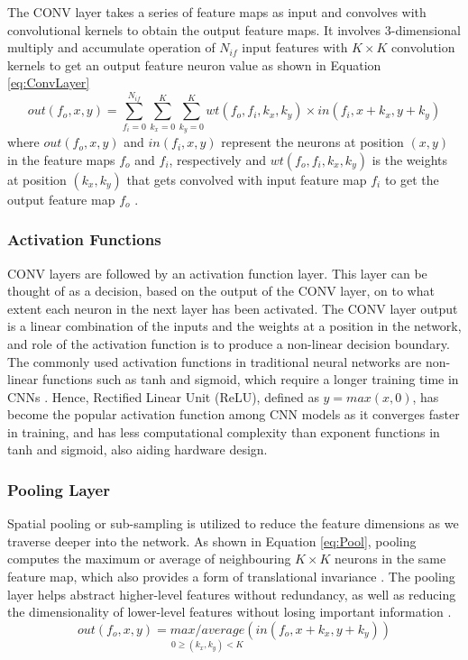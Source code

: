 \documentclass[12pt]{article}
\begin{document}
The CONV layer takes a series of feature maps as input and convolves with convolutional kernels to obtain the output feature maps. It involves 3-dimensional multiply and accumulate operation of $N_{if}$ input features with $K\times K$ convolution kernels to get an output feature neuron value as shown in Equation \ref{eq:ConvLayer}
\begin{equation}
out(f_o,x,y)=\sum^{N_{if}}_{f_i=0} \sum^{K}_{k_x=0} \sum^{K}_{k_y=0} wt(f_o,f_i,k_x,k_y)\times in(f_i,x+k_x,y+k_y)
\label{eq:ConvLayer}
\end{equation}
where $out(f_o,x,y)$ and $in(f_i,x,y)$ represent the neurons at position $(x,y)$ in the feature maps $f_o$ and $f_i$, respectively and $wt(f_o,f_i,k_x,k_y)$ is the weights at position $(k_x,k_y)$ that gets convolved with input feature map $f_i$ to get the output feature map $f_o$ \cite{fpgaCnnAccelerator}.

\subsubsection{Activation Functions}
\label{sec:Background-CNN-Activation}
\vspace{-12pt}

CONV layers are followed by an activation function layer. This layer can be thought of as a decision, based on the output of the CONV layer, on to what extent each neuron in the next layer has been activated. The CONV layer output is a linear combination of the inputs and the weights at a position in the network, and role of the activation function is to produce a non-linear decision boundary. The commonly used activation functions in traditional neural networks are non-linear functions such as tanh and sigmoid, which require a longer training time in CNNs \cite{AlexNet}. Hence, Rectified Linear Unit (ReLU), defined as $y = max(x,0)$, has become the popular activation function among CNN models as it converges faster in training, and has less computational complexity than exponent functions in tanh and sigmoid, also aiding hardware design.

\subsubsection{Pooling Layer}
\label{sec:Background-CNN-Pool}
\vspace{-12pt}

Spatial pooling or sub-sampling is utilized to reduce the feature dimensions as we traverse deeper into the network. As shown in Equation \ref{eq:Pool}, pooling computes the maximum or average of neighbouring $K\times K$ neurons in the same feature map, which also provides a form of translational invariance \cite{PoolAnalysis}. The pooling layer helps abstract higher-level features without redundancy, as well as reducing the dimensionality of lower-level features without losing important information \cite{fpgaCnnAccelerator}.
\begin{equation}
out(f_o,x,y)=\underset{0\geqslant (k_x,k_y)<K}{max/average}(in(f_o,x+k_x,y+k_y))
\label{eq:Pool}
\end{equation}
\end{document}
